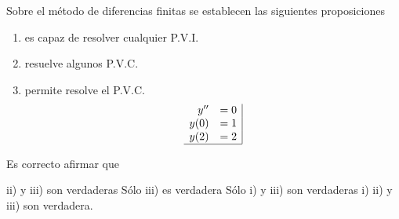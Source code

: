 \begin{pregunta}
\begin{cuerpo}
Sobre el método de diferencias finitas se establecen las siguientes proposiciones
\begin{enumerate}
\item[i)] es capaz de resolver cualquier P.V.I.
\item[ii)] resuelve algunos P.V.C.
\item[iii)] permite resolve el P.V.C.
$$
\begin{array}{rl|}
y'' & =0    \\
y(0)	&=1 \\
y(2)	&=2 \\ \hline
\end{array}
$$
\end{enumerate}
Es correcto afirmar que
\end{cuerpo}
\begin{multicols}{2}
\begin{alternativas}
{ii) y iii) son verdaderas}
{Sólo iii) es verdadera}
{Sólo i) y iii) son verdaderas}
{i) ii) y iii) son verdadera.}
\end{alternativas}
\end{multicols}
\justificacion{0cm}
\end{pregunta}